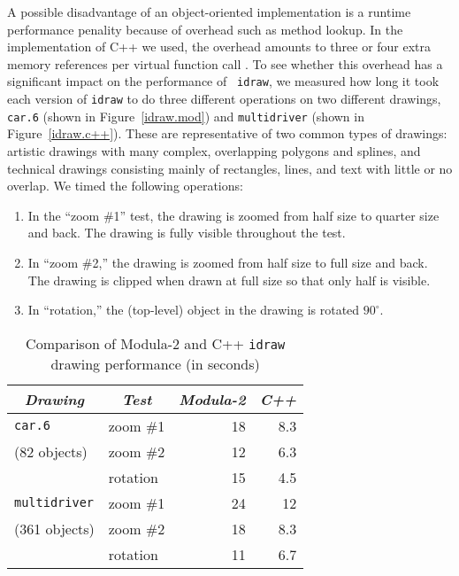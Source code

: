 A possible disadvantage of an object-oriented implementation is a runtime
performance penality because of overhead such as method lookup.  In the
implementation of C++ we used, the overhead amounts to three or four extra
memory references per virtual function call \cite{c++:evolution}.  To see
whether this overhead has a significant impact on the performance of {\tt
idraw}, we measured how long it took each version of {\tt idraw} to do three
different operations on two different drawings, {\tt car.6} (shown in
Figure~\ref{idraw.mod}) and {\tt multidriver} (shown in
Figure~\ref{idraw.c++}).  These are representative of two common types of
drawings:  artistic drawings with many complex, overlapping polygons and
splines, and technical drawings consisting mainly of rectangles, lines, and
text with little or no overlap.  We timed the following operations:
\begin{enumerate}

\item In the ``zoom \#1'' test, the drawing is zoomed from half size to
quarter size and back.  The drawing is fully visible throughout the
test.

\item In ``zoom \#2,'' the drawing is zoomed from half size to full size
and back.  The drawing is clipped when drawn at full size so that only half
is visible.

\item In ``rotation,'' the (top-level) object in the drawing is 
rotated $90^\circ$.

\end{enumerate}

\begin{table*}[t]
\begin{center}
\begin{tabular}{|l|l|r|r|} \hline
    \multicolumn{1}{|c|}{{\em Drawing}} & \multicolumn{1}{c|}{{\em Test}}
	& \multicolumn{1}{c|}{{\em Modula-2}} & \multicolumn{1}{c|}{{\em C++}}
	\\ \hline
    {\tt car.6} & zoom \#1 & 18 & 8.3
	\\
    (82 objects) & zoom \#2 & 12 & 6.3
	\\
	& rotation & 15 & 4.5
	\\ \hline
    {\tt multidriver} & zoom \#1 & 24 & 12\hspace{1.75ex}
	\\
    (361 objects) & zoom \#2 & 18 & 8.3
	\\
	& rotation & 11 & 6.7
	\\ \hline
\end{tabular}
\caption{
    Comparison of \mbox{Modula-2} and C++ {\tt idraw} drawing performance
    (in seconds)
}
\label{performance}
\end{center}
\end{table*}

